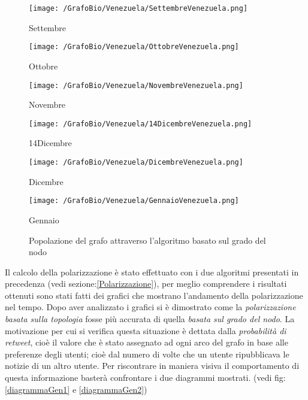 \begin{figure}[!htbp]
\centering
\begin{minipage}[c]{.40\textwidth}
\centering\setlength{\captionmargin}{0pt}%
\texttt{[image: /GrafoBio/Venezuela/SettembreVenezuela.png]}
\caption{Settembre}
\label{Passo0}
\end{minipage}%
\hspace{10mm}%
\begin{minipage}[c]{.40\textwidth}
\centering\setlength{\captionmargin}{0pt}%
\texttt{[image: /GrafoBio/Venezuela/OttobreVenezuela.png]}
\caption{Ottobre}
\label{Passo1}
\end{minipage}
\hspace{10mm}%
\begin{minipage}[c]{.40\textwidth}
\centering\setlength{\captionmargin}{0pt}%
\texttt{[image: /GrafoBio/Venezuela/NovembreVenezuela.png]}
\caption{Novembre}
\label{Passo2}
\end{minipage}
\hspace{10mm}%
\begin{minipage}[c]{.40\textwidth}
\centering\setlength{\captionmargin}{0pt}%
\texttt{[image: /GrafoBio/Venezuela/14DicembreVenezuela.png]}
\caption{14Dicembre}
\label{Passo3}
\end{minipage}
\hspace{10mm}%
\begin{minipage}[c]{.40\textwidth}
\centering\setlength{\captionmargin}{0pt}%
\texttt{[image: /GrafoBio/Venezuela/DicembreVenezuela.png]}
\caption{Dicembre}
\label{Passo3}
\end{minipage}
\hspace{10mm}%
\begin{minipage}[c]{.40\textwidth}
\centering\setlength{\captionmargin}{0pt}%
\texttt{[image: /GrafoBio/Venezuela/GennaioVenezuela.png]}
\caption{Gennaio}
\label{Passo3}
\end{minipage}
\caption{Popolazione del grafo attraverso l'algoritmo basato sul grado del nodo}\label{grafoGradoBio}
\end{figure}

Il calcolo della polarizzazione è stato effettuato con i due algoritmi presentati in precedenza (vedi sezione:\ref{Polarizzazione}), per meglio comprendere i risultati ottenuti sono stati fatti dei grafici che mostrano l'andamento della polarizzazione nel tempo. 
Dopo aver analizzato i grafici si è dimostrato come la \textit{polarizzazione basata sulla topologia} fosse più accurata di quella \textit{basata sul grado del nodo}. La motivazione per cui si verifica questa situazione è dettata dalla \textit{probabilità di retweet}, cioè il valore che è stato assegnato ad ogni arco del grafo in base alle preferenze degli utenti; cioè dal numero di volte che un utente ripubblicava le notizie di un altro utente.
Per riscontrare in maniera visiva il comportamento di questa informazione basterà confrontare i due diagrammi mostrati. (vedi fig:\ref{diagrammaGen1} e \ref{diagrammaGen2}) 

